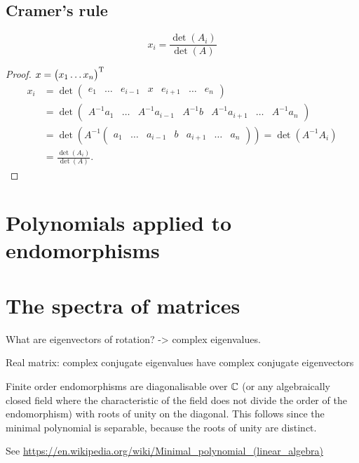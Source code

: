 \subsection{Cramer's rule}
\begin{proposition}
\[ x_i = \frac{\det(A_i)}{\det(A)} \]
\end{proposition}
\begin{proof}
$x = \begin{pmatrix}
x_1 \hdots x_n
\end{pmatrix}^{\mathrm{T}}$
\begin{align*}
x_i &= \det \begin{pmatrix}
e_1 & \hdots & e_{i-1} & x & e_{i+1} & \hdots & e_n
\end{pmatrix} \\
&= \det \begin{pmatrix}
A^{-1}a_1 & \hdots & A^{-1}a_{i-1} & A^{-1}b & A^{-1}a_{i+1} & \hdots & A^{-1}a_n
\end{pmatrix} \\
&= \det (A^{-1}\begin{pmatrix}
a_1 & \hdots & a_{i-1} & b & a_{i+1} & \hdots & a_n
\end{pmatrix}) = \det(A^{-1}A_i) \\
&= \frac{\det(A_i)}{\det(A)}.
\end{align*}
\end{proof}


\section{Polynomials applied to endomorphisms}
\section{The spectra of matrices}
What are eigenvectors of rotation? -> complex eigenvalues.

Real matrix: complex conjugate eigenvalues have complex conjugate eigenvectors

Finite order endomorphisms are diagonalisable over $\mathbb{C}$ (or any algebraically closed field where the characteristic of the field does not divide the order of the endomorphism) with roots of unity on the diagonal. This follows since the minimal polynomial is separable, because the roots of unity are distinct.

See \url{https://en.wikipedia.org/wiki/Minimal_polynomial_(linear_algebra)}


